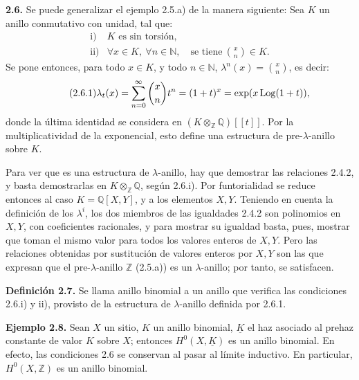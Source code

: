 \textbf{2.6.} Se puede generalizar el ejemplo 2.5.a) de la manera siguiente: Sea \(K\) un anillo conmutativo con unidad, tal que:
\[
\begin{array}{ll}
\text{i)}& K\text{ es sin torsión},\\
\text{ii)}& \forall x\in K,\ \forall n\in\mathbb N,\quad \text{se tiene}\ \binom{x}{n}\in K.
\end{array}
\]
Se pone entonces, para todo \(x\in K\), y todo \(n\in\mathbb N\), \(\lambda^n(x)=\binom{x}{n}\), es decir:
\begin{equation}\tag{2.6.1}
  \lambda_t(x)=\sum_{n=0}^{\infty}\binom{x}{n}t^n
  =(1+t)^x=\exp(x\operatorname{Log}(1+t)),
\end{equation}
donde la última identidad se considera en \((K\otimes_{\mathbb Z}\mathbb Q)[[t]]\). Por la multiplicatividad de la exponencial, esto define una estructura de pre-\(\lambda\)-anillo sobre \(K\).

Para ver que es una estructura de \(\lambda\)-anillo, hay que demostrar las relaciones 2.4.2, y basta demostrarlas en \(K\otimes_{\mathbb Z}\mathbb Q\), según 2.6.i). Por funtorialidad se reduce entonces al caso \(K=\mathbb Q[X,Y]\), y a los elementos \(X,Y\). Teniendo en cuenta la definición de los \(\lambda^i\), los dos miembros de las igualdades 2.4.2 son polinomios en \(X,Y\), con coeficientes racionales, y para mostrar su igualdad basta, pues, mostrar que toman el mismo valor para todos los valores enteros de \(X,Y\). Pero las relaciones obtenidas por sustitución de valores enteros por \(X,Y\) son las que expresan que el pre-\(\lambda\)-anillo \(\mathbb Z\) (2.5.a)) es un \(\lambda\)-anillo; por tanto, se satisfacen.

\textbf{Definición 2.7.} Se llama anillo binomial a un anillo que verifica las condiciones 2.6.i) y ii), provisto de la estructura de \(\lambda\)-anillo definida por 2.6.1.

\textbf{Ejemplo 2.8.} Sean \(X\) un sitio, \(K\) un anillo binomial, \(\underline K\) el haz asociado al prehaz constante de valor \(K\) sobre \(X\); entonces \(H^0(X,\underline K)\) es un anillo binomial. En efecto, las condiciones 2.6 se conservan al pasar al límite inductivo. En particular, \(H^0(X,\mathbb Z)\) es un anillo binomial.

